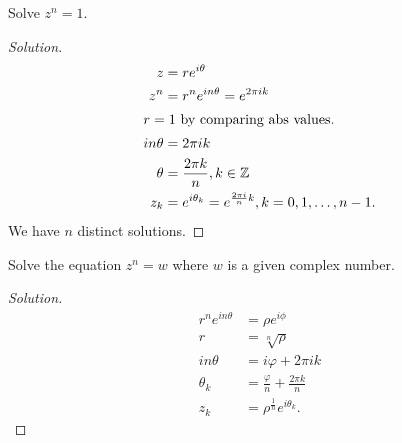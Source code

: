 \begin{example}
	Solve $z^n = 1$.
\begin{proof}[Solution]
\begin{align*}
	z &= r e^{i \theta}\\
	z^n &= r^n e^{i n \theta} = e^{2 \pi i k}\\
	\intertext{$r = 1$ by comparing abs values.}
	i n \theta &= 2 \pi i k\\
	\theta &= \frac{2 \pi k }{n }, k \in  \mathbb{Z}\\
	z_k &= e^{i \theta_k} = e^{\frac{2 \pi i }{n}k}, k = 0,1,\ldots,n-1
.\end{align*}
We have $n $ distinct solutions. 
\end{proof}
\end{example} 
\begin{example}
Solve the equation $z^n = w$ where $w$ is a given complex number.
\begin{proof}[Solution]
\begin{align*}
	r^n e ^{i n \theta} &= \rho e^{i \phi}\\
	r &= \sqrt[n]{\rho} \\
	i n \theta &= i \varphi + 2 \pi i k\\
	\theta_k &= \frac{\varphi}{n }+\frac{2 \pi k }{n}\\
	z_k &= \rho^{\frac{1}{n } } e^{i \theta_k}
.\end{align*}
\end{proof}
\end{example}
